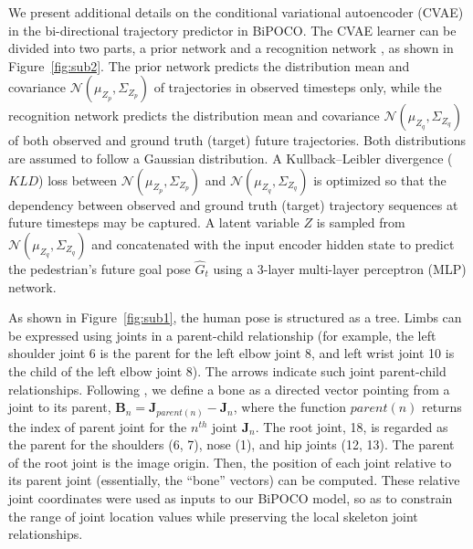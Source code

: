 \documentclass[nohyperref]{article}
\theoremstyle{plain}
\theoremstyle{definition}
\theoremstyle{remark}
\begin{document}
We present additional details on the conditional variational autoencoder (CVAE) in the bi-directional trajectory predictor in BiPOCO. The CVAE learner can be divided into two parts, a prior network and a recognition network \cite{sohn2015learning}, as shown in Figure~\ref{fig:sub2}. The prior network predicts the distribution mean and covariance $\mathcal{N}(\mu_{Z_p}, \Sigma_{Z_p})$ of trajectories in observed timesteps only, while the recognition network predicts the distribution mean and covariance $\mathcal{N}(\mu_{Z_q},\Sigma_{Z_q})$ of both observed and ground truth (target) future trajectories. Both distributions are assumed to follow a Gaussian distribution. A Kullback–Leibler divergence ($KLD$) loss between $\mathcal{N}(\mu_{Z_p}, \Sigma_{Z_p})$ and $\mathcal{N}(\mu_{Z_q},\Sigma_{Z_q})$ is optimized so that the dependency between observed and ground truth (target) trajectory sequences at future timesteps may be captured.  A latent variable $Z$ is sampled from $\mathcal{N}(\mu_{Z_q},\Sigma_{Z_q})$ and concatenated with the input encoder hidden state to predict the pedestrian's future goal pose $\hat{G}_t$ using a 3-layer multi-layer perceptron  (MLP) network.


As shown in Figure~\ref{fig:sub1}, the human pose is structured as a tree.  Limbs can be expressed using joints in a parent-child relationship (for example, the left shoulder joint 6 is the parent for the left elbow joint 8, and left wrist joint 10 is the child of the left elbow joint 8). The arrows indicate such joint parent-child relationships. Following \cite{sun2017compositional}, we define a bone as a directed vector pointing from a joint to its parent, $\mathbf{B}_{n} = {\mathbf{J}}_{parent(n)} -{\mathbf{J}}_{n}$, where the function $parent(n)$ returns the index of parent joint for the $n^{th}$ joint $\mathbf{J}_n$. The root joint, 18, is regarded as the parent for the shoulders (6, 7), nose (1), and hip joints (12, 13). The parent of the root joint is the image origin. Then, the position of each joint relative to its parent joint (essentially, the ``bone'' vectors) can be computed. These relative joint coordinates were used as inputs to our BiPOCO model, so as to constrain the range of joint location values while  preserving the local skeleton joint relationships.
\end{document}
